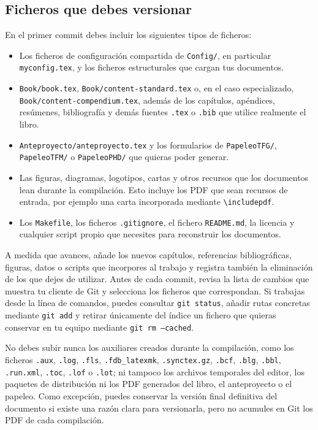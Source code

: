 \subsection{Ficheros que debes versionar}
\label{sec:ficheros-versionar}

En el primer commit debes incluir los siguientes tipos de ficheros:

\begin{itemize}
  \item Los ficheros de configuración compartida de \texttt{Config/}, en particular \texttt{myconfig.tex}, y los ficheros estructurales que cargan tus documentos.
  \item \texttt{Book/book.tex}, \texttt{Book/content-standard.tex} o, en el caso especializado, \texttt{Book/content-compendium.tex}, además de los capítulos, apéndices, resúmenes, bibliografía y demás fuentes \texttt{.tex} o \texttt{.bib} que utilice realmente el libro.
  \item \texttt{Anteproyecto/anteproyecto.tex} y los formularios de \texttt{PapeleoTFG/}, \texttt{PapeleoTFM/} o \texttt{PapeleoPHD/} que quieras poder generar.
  \item Las figuras, diagramas, logotipos, cartas y otros recursos que los documentos lean durante la compilación. Esto incluye los PDF que sean recursos de entrada, por ejemplo una carta incorporada mediante \texttt{\textbackslash{}includepdf}.
  \item Los \texttt{Makefile}, los ficheros \texttt{.gitignore}, el fichero \texttt{README.md}, la licencia y cualquier script propio que necesites para reconstruir los documentos.
\end{itemize}

A medida que avances, añade los nuevos capítulos, referencias bibliográficas, figuras, datos o scripts que incorpores al trabajo y registra también la eliminación de los que dejes de utilizar. Antes de cada commit, revisa la lista de cambios que muestra tu cliente de Git y selecciona los ficheros que correspondan. Si trabajas desde la línea de comandos, puedes consultar \texttt{git status}, añadir rutas concretas mediante \texttt{git add} y retirar únicamente del índice un fichero que quieras conservar en tu equipo mediante \texttt{git rm --cached}.

No debes subir nunca los auxiliares creados durante la compilación, como los ficheros \texttt{.aux}, \texttt{.log}, \texttt{.fls}, \texttt{.fdb\_latexmk}, \texttt{.synctex.gz}, \texttt{.bcf}, \texttt{.blg}, \texttt{.bbl}, \texttt{.run.xml}, \texttt{.toc}, \texttt{.lof} o \texttt{.lot}; ni tampoco los archivos temporales del editor, los paquetes de distribución ni los PDF generados del libro, el anteproyecto o el papeleo. Como excepción, puedes conservar la versión final definitiva del documento si existe una razón clara para versionarla, pero no acumules en Git los PDF de cada compilación.

